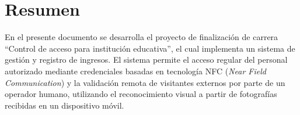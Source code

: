 \section{Resumen}

En el presente documento se desarrolla el proyecto de finalización de carrera \enquote{Control de acceso para institución educativa}, el cual implementa un sistema de gestión y registro de ingresos. El sistema permite el acceso regular del personal autorizado mediante credenciales basadas en tecnología NFC (\textit{Near Field Communication}) y la validación remota de visitantes externos por parte de un operador humano, utilizando el reconocimiento visual a partir de fotografías recibidas en un dispositivo móvil.
\newpage